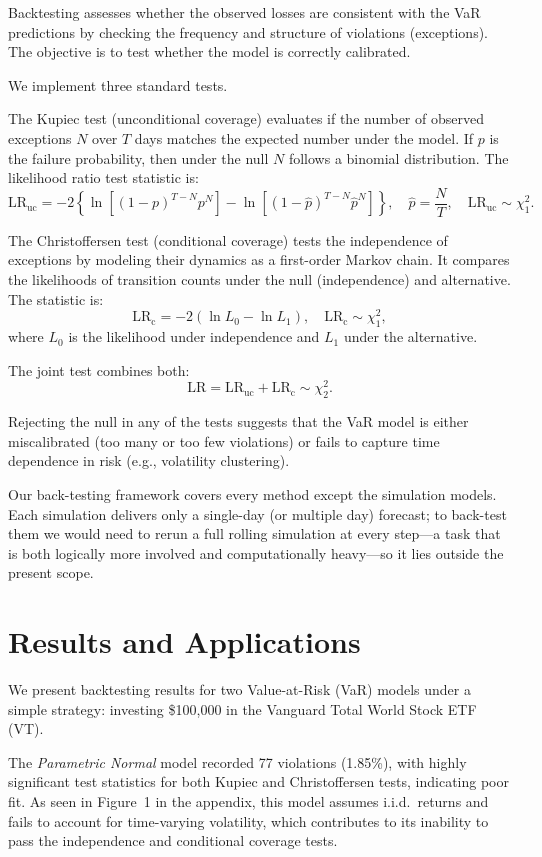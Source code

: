 \documentclass{article}
\begin{document}
Backtesting assesses whether the observed losses are consistent with the VaR predictions by checking the frequency and structure of violations (exceptions). The objective is to test whether the model is correctly calibrated.

We implement three standard tests.

The Kupiec test (unconditional coverage) evaluates if the number of observed exceptions $N$ over $T$ days matches the expected number under the model. If $p$ is the failure probability, then under the null $N$ follows a binomial distribution. The likelihood ratio test statistic is:
\[
\text{LR}_{\text{uc}} = -2 \left\{ \ln\left[(1 - p)^{T - N} p^N \right] - \ln\left[(1 - \hat{p})^{T - N} \hat{p}^N \right] \right\}, \quad \hat{p} = \frac{N}{T}, \quad \text{LR}_{\text{uc}} \sim \chi^2_1.
\]

The Christoffersen test (conditional coverage) tests the independence of exceptions by modeling their dynamics as a first-order Markov chain. It compares the likelihoods of transition counts under the null (independence) and alternative. The statistic is:
\[
\text{LR}_{\text{c}} = -2 (\ln L_0 - \ln L_1), \quad \text{LR}_{\text{c}} \sim \chi^2_1,
\]
where $L_0$ is the likelihood under independence and $L_1$ under the alternative.

The joint test combines both:
\[
\text{LR} = \text{LR}_{\text{uc}} + \text{LR}_{\text{c}} \sim \chi^2_2.
\]

Rejecting the null in any of the tests suggests that the VaR model is either miscalibrated (too many or too few violations) or fails to capture time dependence in risk (e.g., volatility clustering).

Our back-testing framework covers every method except the simulation models. Each simulation delivers only a single-day (or multiple day) forecast; to back-test them we would need to rerun a full rolling simulation at every step—a task that is both logically more involved and computationally heavy—so it lies outside the present scope.


\section{Results and Applications}

We present backtesting results for two Value-at-Risk (VaR) models under a simple strategy: investing \$100{,}000 in the Vanguard Total World Stock ETF (VT).

The \textit{Parametric Normal} model recorded 77 violations (1.85\%), with highly significant test statistics for both Kupiec and Christoffersen tests, indicating poor fit. As seen in Figure 1 in the appendix, this model assumes i.i.d.\ returns and fails to account for time-varying volatility, which contributes to its inability to pass the independence and conditional coverage tests.
\end{document}
